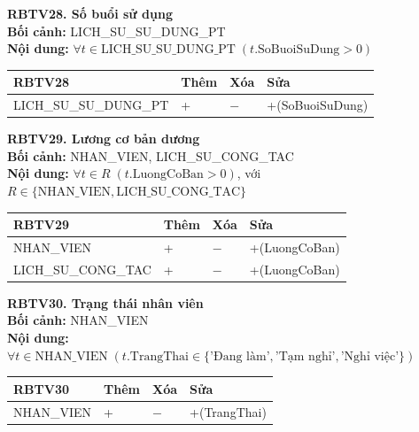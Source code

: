 \documentclass[11pt, a4paper]{article}
\begin{document}
\vspace{0.8em}
\textbf{RBTV28. Số buổi sử dụng} \\
\textbf{Bối cảnh:} LICH\_SU\_SU\_DUNG\_PT \\
\textbf{Nội dung:} $\forall t \in \text{LICH\_SU\_SU\_DUNG\_PT} \; (t.\text{SoBuoiSuDung} > 0)$

\vspace{0.3em}
\begin{small}
\begin{tabularx}{\textwidth}{| C{4.2cm} | C{2cm} | C{2cm} | Y |}
\hline
\textbf{RBTV28} & \textbf{Thêm} & \textbf{Xóa} & \textbf{Sửa} \\
\hline
LICH\_SU\_SU\_DUNG\_PT & + & $-$ & +(SoBuoiSuDung) \\
\hline
\end{tabularx}
\end{small}

\vspace{0.8em}
\textbf{RBTV29. Lương cơ bản dương} \\
\textbf{Bối cảnh:} NHAN\_VIEN, LICH\_SU\_CONG\_TAC \\
\textbf{Nội dung:} $\forall t \in R \; (t.\text{LuongCoBan} > 0)$, với $R \in \{\text{NHAN\_VIEN}, \text{LICH\_SU\_CONG\_TAC}\}$

\vspace{0.3em}
\begin{small}
\begin{tabularx}{\textwidth}{| C{4.2cm} | C{2cm} | C{2cm} | Y |}
\hline
\textbf{RBTV29} & \textbf{Thêm} & \textbf{Xóa} & \textbf{Sửa} \\
\hline
NHAN\_VIEN & + & $-$ & +(LuongCoBan) \\
\hline
LICH\_SU\_CONG\_TAC & + & $-$ & +(LuongCoBan) \\
\hline
\end{tabularx}
\end{small}

\vspace{0.8em}
\textbf{RBTV30. Trạng thái nhân viên} \\
\textbf{Bối cảnh:} NHAN\_VIEN \\
\textbf{Nội dung:} $\forall t \in \text{NHAN\_VIEN} \; (t.\text{TrangThai} \in \{\text{'Đang làm'}, \text{'Tạm nghỉ'}, \text{'Nghỉ việc'}\})$

\vspace{0.3em}
\begin{small}
\begin{tabularx}{\textwidth}{| C{4.2cm} | C{2cm} | C{2cm} | Y |}
\hline
\textbf{RBTV30} & \textbf{Thêm} & \textbf{Xóa} & \textbf{Sửa} \\
\hline
NHAN\_VIEN & + & $-$ & +(TrangThai) \\
\hline
\end{tabularx}
\end{small}
\end{document}
